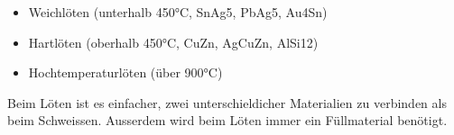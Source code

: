 \begin{itemize}
    \item Weichlöten (unterhalb 450°C, SnAg5, PbAg5, Au4Sn)
    \item Hartlöten (oberhalb 450°C, CuZn, AgCuZn, AlSi12)
    \item Hochtemperaturlöten (über 900°C)
\end{itemize}
Beim Löten ist es einfacher, zwei unterschieldicher Materialien zu 
verbinden als beim Schweissen. Ausserdem wird beim Löten immer 
ein Füllmaterial benötigt.
